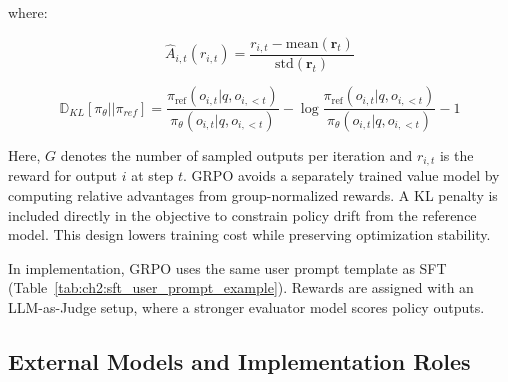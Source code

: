 where:

\begin{equation*}
    \hat{A}_{i,t}(r_{i, t}) = \frac{r_{i, t} - \text{mean}(\mathbf{r}_t)}{\text{std}(\mathbf{r}_t)}
\end{equation*}

\begin{equation*}
    \mathbb{D}_{KL}[\pi_{\theta} || \pi_{ref}] = \frac{\pi_{\text{ref}}(o_{i, t} | q, o_{i, <t})}{\pi_{\theta}(o_{i, t} | q, o_{i, <t})} - \log \frac{\pi_{\text{ref}}(o_{i, t} | q, o_{i, <t})}{\pi_{\theta}(o_{i, t} | q, o_{i, <t})} - 1
\end{equation*}


Here, $G$ denotes the number of sampled outputs per iteration and $r_{i,t}$ is the reward for output $i$ at step $t$. GRPO avoids a separately trained value model by computing relative advantages from group-normalized rewards. A KL penalty is included directly in the objective to constrain policy drift from the reference model. This design lowers training cost while preserving optimization stability.

In implementation, GRPO uses the same user prompt template as SFT (Table~\ref{tab:ch2:sft_user_prompt_example}). Rewards are assigned with an LLM-as-Judge setup, where a stronger evaluator model scores policy outputs.

\subsection*{External Models and Implementation Roles}

